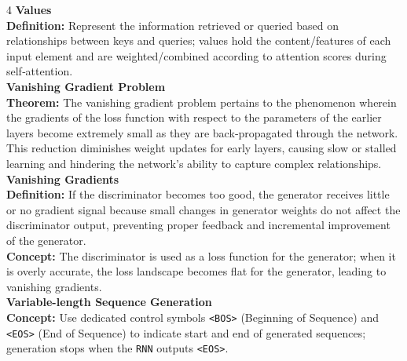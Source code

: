 \documentclass[8pt]{extarticle}
\begin{document}
\begin{multicols}{4}
\vspace{2pt}\textbf{Values}\\
\textbf{Definition:} Represent the information retrieved or queried based on relationships between keys and queries; values hold the content/features of each input element and are weighted/combined according to attention scores during self‑attention.\\

\vspace{2pt}\textbf{Vanishing Gradient Problem}\\
\textbf{Theorem:} The vanishing gradient problem pertains to the phenomenon wherein the gradients of the loss function with respect to the parameters of the earlier layers become extremely small as they are back‑propagated through the network. This reduction diminishes weight updates for early layers, causing slow or stalled learning and hindering the network’s ability to capture complex relationships.\\

\vspace{2pt}\textbf{Vanishing Gradients}\\
\textbf{Definition:} If the discriminator becomes too good, the generator receives little or no gradient signal because small changes in generator weights do not affect the discriminator output, preventing proper feedback and incremental improvement of the generator.\\
\textbf{Concept:} The discriminator is used as a loss function for the generator; when it is overly accurate, the loss landscape becomes flat for the generator, leading to vanishing gradients.\\

\vspace{2pt}\textbf{Variable-length Sequence Generation}\\
\textbf{Concept:} Use dedicated control symbols \texttt{<BOS>} (Beginning of Sequence) and \texttt{<EOS>} (End of Sequence) to indicate start and end of generated sequences; generation stops when the \texttt{RNN} outputs \texttt{<EOS>}.\\


\end{multicols}
\end{document}
